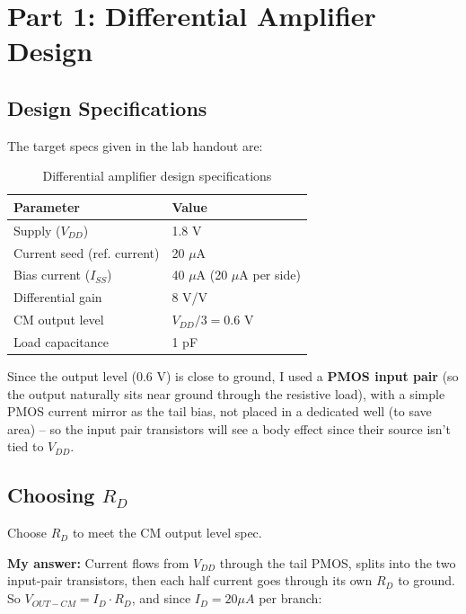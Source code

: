 \documentclass[11pt]{article}
\newcommand{\answer}[1]{
  \par\vspace{2pt}
  \noindent\textbf{\color{itiCrimson}My answer:} #1
  \vspace{6pt}
}
\begin{document}
\newpage
\section{Part 1: Differential Amplifier Design}

\subsection{Design Specifications}
The target specs given in the lab handout are:

\begin{table}[H]
\centering
\begin{tabular}{ll}
\toprule
\textbf{Parameter} & \textbf{Value} \\
\midrule
Supply ($V_{DD}$) & 1.8 V \\
Current seed (ref. current) & 20 $\mu$A \\
Bias current ($I_{SS}$) & 40 $\mu$A (20 $\mu$A per side) \\
Differential gain & 8 V/V \\
CM output level & $V_{DD}/3 = 0.6$ V \\
Load capacitance & 1 pF \\
\bottomrule
\end{tabular}
\caption{Differential amplifier design specifications}
\end{table}

Since the output level (0.6 V) is close to ground, I used a \textbf{PMOS input pair} (so the output naturally
sits near ground through the resistive load), with a simple PMOS current mirror as the tail bias, not placed
in a dedicated well (to save area) -- so the input pair transistors will see a body effect since their source
isn't tied to $V_{DD}$.

\subsection{Choosing $R_D$}
\begin{qbox}
Choose $R_D$ to meet the CM output level spec.
\end{qbox}
\answer{Current flows from $V_{DD}$ through the tail PMOS, splits into the two input-pair transistors, then
each half current goes through its own $R_D$ to ground. So $V_{OUT-CM} = I_D \cdot R_D$, and since $I_D = 20\mu A$
per branch:}
\end{document}
